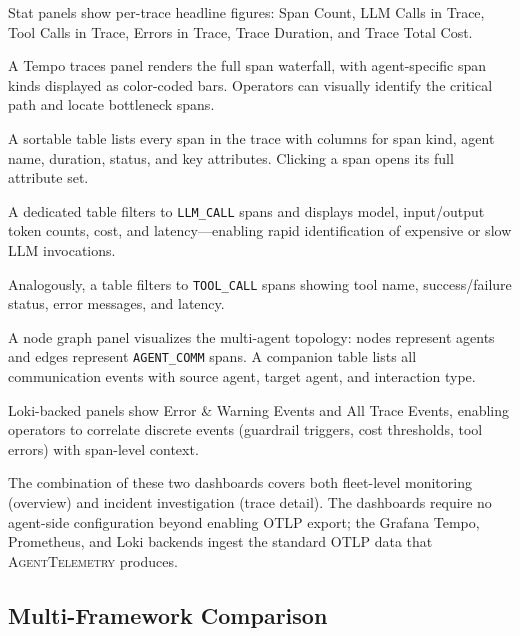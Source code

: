 \documentclass[sigconf,nonacm]{acmart}
\begin{document}
\begin{description}[leftmargin=*,nosep,style=unboxed]
    \item[Trace Summary.]  Stat panels show per-trace headline figures:
        Span Count, LLM Calls in Trace, Tool Calls in Trace, Errors in
        Trace, Trace Duration, and Trace Total Cost.
    \item[Trace Timeline.]  A Tempo traces panel renders the full span
        waterfall, with agent-specific span kinds displayed as
        color-coded bars.  Operators can visually identify the critical
        path and locate bottleneck spans.
    \item[Span Details.]  A sortable table lists every span in the trace
        with columns for span kind, agent name, duration, status, and
        key attributes.  Clicking a span opens its full attribute set.
    \item[LLM Call Details.]  A dedicated table filters to
        \texttt{LLM\_CALL} spans and displays model, input/output token
        counts, cost, and latency---enabling rapid identification of
        expensive or slow LLM invocations.
    \item[Tool Call Details.]  Analogously, a table filters to
        \texttt{TOOL\_CALL} spans showing tool name, success/failure
        status, error messages, and latency.
    \item[Inter-Agent Communication.]  A node graph panel visualizes the
        multi-agent topology: nodes represent agents and edges represent
        \texttt{AGENT\_COMM} spans.  A companion table lists all
        communication events with source agent, target agent, and
        interaction type.
    \item[Events \& Errors.]  Loki-backed panels show Error \& Warning
        Events and All Trace Events, enabling operators to correlate
        discrete events (guardrail triggers, cost thresholds, tool
        errors) with span-level context.
\end{description}

The combination of these two dashboards covers both fleet-level
monitoring (overview) and incident investigation (trace detail).  The
dashboards require no agent-side configuration beyond enabling OTLP
export; the Grafana Tempo, Prometheus, and Loki backends ingest the
standard OTLP data that \textsc{AgentTelemetry} produces.

\subsection{Multi-Framework Comparison}
\label{sec:framework_comparison}
\end{document}
